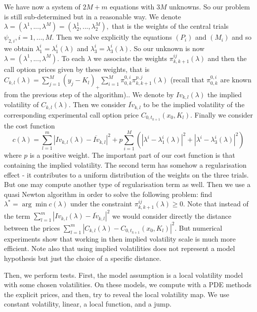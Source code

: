 \documentclass[a4paper]{article}
\begin{document}
We have now a system of $2M+m$ equations with $3M$ unknowns. So
our problem is still sub-determined but in a reasonable way. We
denote $\lambda =(\lambda ^{1},...,\lambda ^{M})=(\lambda
_{2}^{1},...,\lambda _{2}^{M}),$ that is the weights of the
central trials $\psi _{2,i},i=1,...,M.$ Then we solve explicitly
the equations $(P_{i})$ and $(M_{i})$ and so we obtain $\lambda
_{1}^{i}=\lambda _{1}^{i}(\lambda )$ and $\lambda _{3}^{i}=\lambda
_{3}^{i}(\lambda ).$ So our unknown is now $\lambda =(\lambda
^{1},...,\lambda ^{M}).$ To each $\lambda $ we associate the weights $%
\pi _{k,k+1}^{ij}(\lambda )$ and then the call option prices given
by these weights, that is $C_{k,l}(\lambda )=\sum_{j=1}^{M}(y_{j}
-K_{l} )_{+}\sum_{i=1}^{M}\pi _{0,k}^{0,i}\pi _{k,k+1}^{p,j}
(\lambda )$ (recall that $\pi _{0,k}^{0,i}$ are known from the
previous step of the algorithm).$.$ We denote by $Iv_{k,l}(\lambda
)$ the implied volatility of $C_{k,l}(\lambda )$. Then we consider
$\overline{Iv}_{k,l}$ to be the implied volatility of the
corresponding experimental call option price $C_{0,t_{k+1}}
(x_{0},K_{l}).$ Finally we consider the cost function
\[
c(\lambda )=\sum_{l=1}^{m}\left| Iv_{k,l}(\lambda )-\overline{Iv}%
_{k,l}\right| ^{2}+p\sum_{i=1}^{M}(\left| \lambda ^{i}-\lambda
_{1}^{i}(\lambda )\right| ^{2}+\left| \lambda ^{i}-\lambda
_{3}^{i}(\lambda )\right| ^{2})
\]
where $p$ is a positive weight. The important part of our cost
function is that containing the implied volatility. The second
term has somehow a regularisation effect - it contributes to a
uniform distribution of the weights on the three trials. But one
may compute another type of regularisation term as well. Then we
use a quasi Newton algorithm in order to solve the following
problem: find $\lambda ^{*}=\arg \min c(\lambda )$ under the
constraint $\pi _{k,k+1}^{ij}(\lambda )\geq 0.$
Note that instead of the term $\sum_{l=1}^{m}\left| Iv_{k,l}(\lambda )-%
\overline{Iv}_{k,l}\right| ^{2}$ we would consider directly the
distance between the prices $\sum_{l=1}^{m}\left| C_{k,l}(\lambda
)-C_{0,t_{k+1}}(x_{0},K_{l})\right| ^{2}.$ But numerical
experiments show that working in then implied volatility scale is
much more efficient. Note also that using implied volatilities
does not represent a model hypothesis but just the choice of a
specific distance.

Then, we perform tests. First, the model assumption is a local
volatility model with some chosen volatilities. On these models,
we compute with a PDE methods the explicit prices, and then, try
to reveal the local volatility map. We use constant volatility,
linear, a local function, and a jump.
\end{document}
